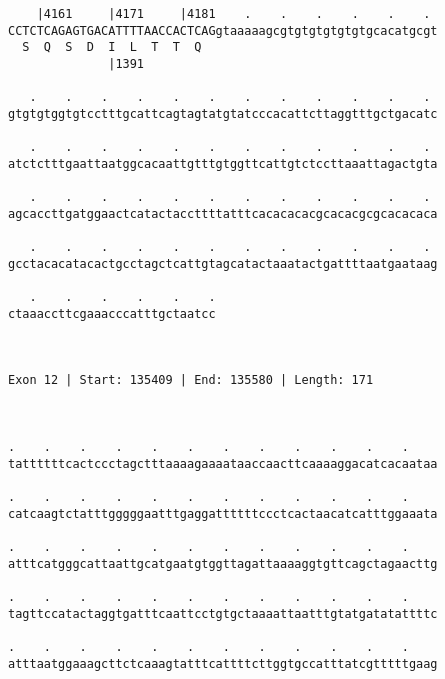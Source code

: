 \documentclass{article}
\begin{document}
\begin{Verbatim}
    |4161     |4171     |4181    .    .    .    .    .    . 
CCTCTCAGAGTGACATTTTAACCACTCAGgtaaaaagcgtgtgtgtgtgtgcacatgcgt
  S  Q  S  D  I  L  T  T  Q                                 
              |1391                                         
  
   .    .    .    .    .    .    .    .    .    .    .    . 
gtgtgtggtgtcctttgcattcagtagtatgtatcccacattcttaggtttgctgacatc
                                                            
   .    .    .    .    .    .    .    .    .    .    .    . 
atctctttgaattaatggcacaattgtttgtggttcattgtctccttaaattagactgta
                                                            
   .    .    .    .    .    .    .    .    .    .    .    . 
agcaccttgatggaactcatactaccttttatttcacacacacgcacacgcgcacacaca
                                                            
   .    .    .    .    .    .    .    .    .    .    .    . 
gcctacacatacactgcctagctcattgtagcatactaaatactgattttaatgaataag
                                                            
   .    .    .    .    .    .
ctaaaccttcgaaacccatttgctaatcc
                             
                             
 
Exon 12 | Start: 135409 | End: 135580 | Length: 171



.    .    .    .    .    .    .    .    .    .    .    .    
tattttttcactccctagctttaaaagaaaataaccaacttcaaaaggacatcacaataa
                                                            
.    .    .    .    .    .    .    .    .    .    .    .    
catcaagtctatttgggggaatttgaggattttttccctcactaacatcatttggaaata
                                                            
.    .    .    .    .    .    .    .    .    .    .    .    
atttcatgggcattaattgcatgaatgtggttagattaaaaggtgttcagctagaacttg
                                                            
.    .    .    .    .    .    .    .    .    .    .    .    
tagttccatactaggtgatttcaattcctgtgctaaaattaatttgtatgatatattttc
                                                            
.    .    .    .    .    .    .    .    .    .    .    .    
atttaatggaaagcttctcaaagtatttcattttcttggtgccatttatcgtttttgaag
                                                            

\end{Verbatim}
\end{document}

